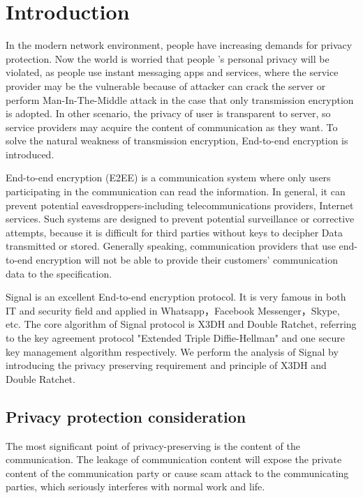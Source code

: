 \documentclass[11pt,en]{elegantpaper}
\begin{document}
\section{Introduction}
In the modern network environment, people have increasing demands for privacy protection. Now the world is worried that people ’s personal privacy will be violated, as people use instant messaging apps and services, where the service provider may be the vulnerable because of attacker can crack the server or perform Man-In-The-Middle attack in the case that only transmission encryption is adopted. In other scenario, the privacy of user is transparent to server, so service providers may acquire the content of communication as they want. To solve the natural weakness of transmission encryption, End-to-end encryption is introduced.

End-to-end encryption (E2EE) is a communication system where only users participating in the communication can read the information. In general, it can prevent potential eavesdroppers-including telecommunications providers, Internet services. Such systems are designed to prevent potential surveillance or corrective attempts, because it is difficult for third parties without keys to decipher Data transmitted or stored. Generally speaking, communication providers that use end-to-end encryption will not be able to provide their customers' communication data to the specification.

Signal is an excellent End-to-end encryption protocol.\cite{alwen2019double} It is very famous in both IT and security field and applied in Whatsapp，Facebook Messenger，Skype, etc. The core algorithm of Signal protocol is X3DH and Double Ratchet, referring to the key agreement protocol "Extended Triple Diffie-Hellman" and one secure key management algorithm respectively.
We perform the analysis of Signal by introducing the privacy preserving requirement and principle of X3DH and Double Ratchet.

\subsection{Privacy protection consideration}
The most significant point of privacy-preserving is the content of the communication. The leakage of communication content will expose the private content of the communication party or cause scam attack to the communicating parties, which seriously interferes with normal work and life.
\end{document}
